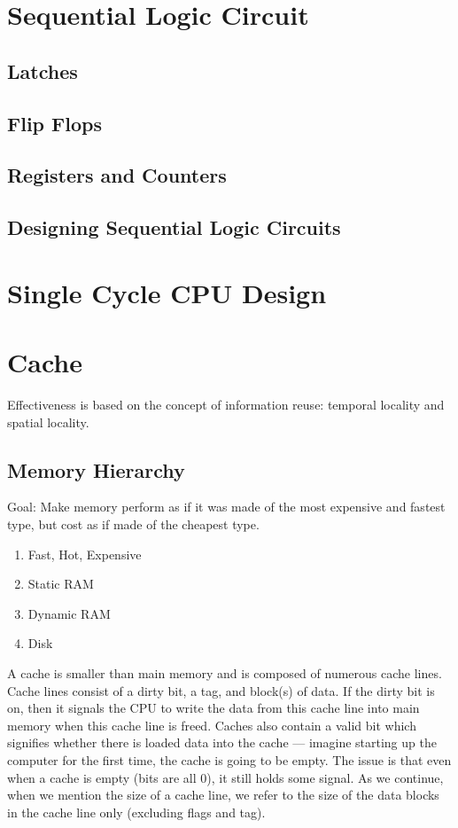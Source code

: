 \documentclass[11pt]{article}
\begin{document}
\section{Sequential Logic Circuit}

\subsection{Latches}

\subsection{Flip Flops}

\subsection{Registers and Counters}

\subsection{Designing Sequential Logic Circuits}

\section{Single Cycle CPU Design}

\section{Cache}

Effectiveness is based on the concept of information reuse: temporal locality and spatial locality.

\subsection{Memory Hierarchy}

Goal: Make memory perform as if it was made of the most expensive and fastest type, but cost as if made of the cheapest type.

\begin{enumerate}
	\item Fast, Hot, Expensive
	\item Static RAM
	\item Dynamic RAM
	\item Disk
\end{enumerate}

\noindent A cache is smaller than main memory and is composed of numerous cache lines. Cache lines consist of a dirty bit, a tag, and block(s) of data. If the dirty bit is on, then it signals the CPU to write the data from this cache line into main memory when this cache line is freed. Caches also contain a valid bit which signifies whether there is loaded data into the cache --- imagine starting up the computer for the first time, the cache is going to be empty. The issue is that even when a cache is empty (bits are all 0), it still holds some signal. As we continue, when we mention the size of a cache line, we refer to the size of the data blocks in the cache line only (excluding flags and tag).
\end{document}
